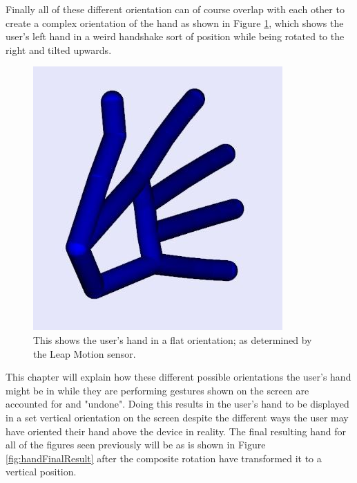 Finally all of these different orientation can of course overlap with each other to create a complex orientation of the hand as shown in Figure \ref{fig:weirdHandShake}, which shows the user's left hand in a weird handshake sort of position while being rotated to the right and tilted upwards.
\begin{figure}[H]
\centering
\includegraphics[scale=0.45]{Figures/4_handWeirdHandshake.JPG}
\caption[Hand in Weird Handshake Position]{This shows the user's hand in a flat orientation; as determined by the Leap Motion sensor.}
\label{fig:weirdHandShake}
\end{figure}
This chapter will explain how these different possible orientations the user's hand might be in while they are performing gestures shown on the screen are accounted for and "undone". Doing this results in the user's hand to be displayed in a set vertical orientation on the screen despite the different ways the user may have oriented their hand above the device in reality. The final resulting hand for all of the figures seen previously  will be as is shown in Figure \ref{fig:handFinalResult} after the composite rotation have transformed it to a vertical position. 
